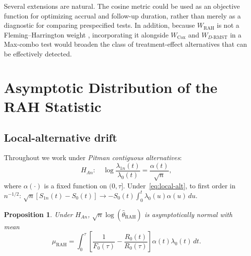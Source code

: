 \documentclass[12pt]{article}
\newtheorem{proposition}{Proposition}
\newcommand{\RAH}{\mathrm{RAH}}
\newcommand{\DRMST}{D\text{-}\mathrm{RMST}}
\newcommand{\dd}{\,d}
\begin{document}
Several extensions are natural. The cosine metric could be used as an objective function for optimizing accrual and follow-up duration, rather than merely as a diagnostic for comparing prespecified tests. In addition, because $W_{\RAH}$ is not a Fleming--Harrington weight \citep{FlemingHarrington1991}, incorporating it alongside $W_{\mathrm{Cox}}$ and $W_{\DRMST}$ in a Max-combo test would broaden the class of treatment-effect alternatives that can be effectively detected.


\appendix

\section{Asymptotic Distribution of the RAH Statistic}
\label{sec:appendix-proofs}

\subsection{Local-alternative drift}
Throughout we work under \emph{Pitman contiguous alternatives}:
\begin{equation}\label{eq:local-alt}
  H_{An}:\quad
  \log\frac{\lambda_{1n}(t)}{\lambda_0(t)}=\frac{\alpha(t)}{\sqrt{n}},
\end{equation}
where $\alpha(\cdot)$ is a fixed function on $(0,\tau]$.
Under~\eqref{eq:local-alt}, to first order in $n^{-1/2}$:
$\sqrt{n}[S_{1n}(t)-S_0(t)]\to-S_0(t)\int_0^t\lambda_0(u)\alpha(u)\dd u$.

\begin{proposition}\label{prop:mean-rah}
Under $H_{An}$, $\sqrt{n}\log(\hat\theta_{\RAH})$ is asymptotically normal
with mean
\begin{equation}\label{eq:mean-RAH-compact}
  \mu_{\RAH}
    =\int_0^\tau
       \!\left[\frac{1}{F_0(\tau)}-\frac{R_0(t)}{R_0(\tau)}\right]
       \alpha(t)\lambda_0(t)\dd t.
\end{equation}
\end{proposition}
\end{document}
